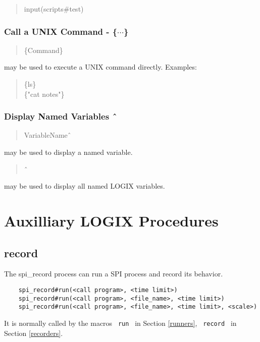 \begin{verse}
    input(scripts\#test)
\end{verse}

\subsection{Call a UNIX Command - \{$\cdots$\}}

\begin{verse}
    \{Command\}
\end{verse}

\noindent
may be used to execute a UNIX command directly.  Examples:

\begin{verse}
    \{ls\} \\
    \{"cat notes"\}
\end{verse}

\subsection{Display Named Variables \^\ }

\begin{verse}
    VariableName\^\ 
\end{verse}

\noindent
may be used to display a named variable.

\begin{verse}
    \^\ 
\end{verse}

\noindent
may be used to display all named LOGIX variables.

\chapter{Auxilliary LOGIX Procedures}
\label{auxilliary}

\section{record}
\label{record}
The spi\_record process can run a SPI process
and record its behavior.

\begin{verbatim}
    spi_record#run(<call program>, <time limit>)
    spi_record#run(<call program>, <file_name>, <time limit>)
    spi_record#run(<call program>, <file_name>, <time limit>, <scale>)
\end{verbatim}

\noindent
It is normally called by the macros \verb+ run + in Section
\ref{runners}, \verb+ record + in Section \ref{recorders}.

